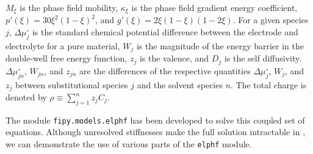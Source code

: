 \( M_\xi \) is the phase field mobility, \( \kappa_\xi \) is the phase
field gradient energy coefficient, \( p'(\xi) =
30\xi^2\left(1-\xi\right)^2 \), and \( g'(\xi) =
2\xi\left(1-\xi\right)\left(1-2\xi\right) \).  For a given species \(
j \), \( \Delta\mu_j^{\circ} \) is the standard chemical potential
difference between the electrode and electrolyte for a pure material,
\( W_j \) is the magnitude of the energy barrier in the double-well
free energy function, \( z_j \) is the valence, and \( D_{j} \) is the
self diffusivity.  \( \Delta\mu_{jn}^{\circ} \), \( W_{jn} \), and \(
z_{jn} \) are the differences of the respective quantities \(
\Delta\mu_{j}^{\circ} \), \( W_{j} \), and \( z_{j} \) between
substitutional species \( j \) and the solvent species \( n \).  The
total charge is denoted by \( \rho \equiv \sum_{j=1}^n z_j C_j \).

The module \verb+fipy.models.elphf+ has been developed to solve this
coupled set of equations.  Although unresolved stiffnesses make the
full solution intractable in \FiPy{}, we can demonstrate the use of
various parts of the \verb+elphf+ module.
